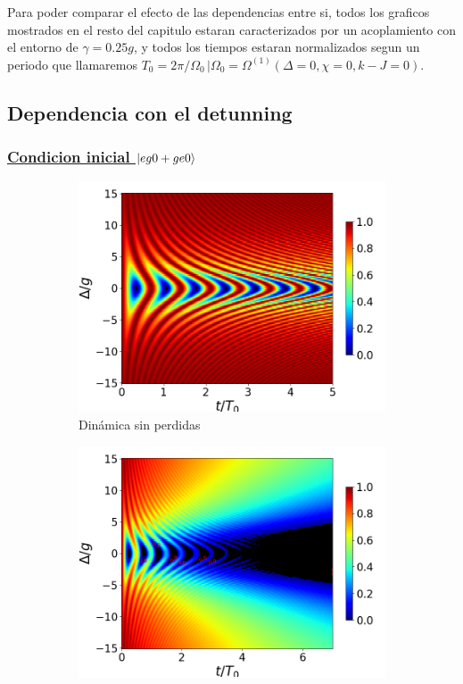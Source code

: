 Para poder comparar el efecto de las dependencias entre si, todos los graficos mostrados en el resto del capitulo estaran caracterizados por un acoplamiento con el entorno de $\gamma=0.25g$, y todos los tiempos estaran normalizados segun un periodo que llamaremos $T_0=2\pi/\Omega_0 \, | \Omega_0=\Omega^{(1)}(\Delta=0,\chi=0,k-J=0)$.
\subsection{Dependencia con el detunning}
\subsubsection{\underline{Condicion inicial $\ket{eg0+ge0}$}}
\begin{figure}[h]
    \centering
    \begin{subfigure}{0.49\textwidth}
        \includegraphics[width=\textwidth]{figuras/ch4/concu/delta/eg0+ge0 k=0.0g x=0.0g J=0.0g gamma=0.25g concu delta uni.png}
        \caption{Dinámica sin perdidas}
        \label{fig4:concu detunning 0 uni}
    \end{subfigure}
    \hfill
    \begin{subfigure}{0.49\textwidth}
        \includegraphics[width=\textwidth]{figuras/ch4/concu/delta/eg0+ge0 k=0.0g x=0.0g J=0.0g gamma=0.25g concu delta dis.png}

\end{subfigure}
\end{figure}
